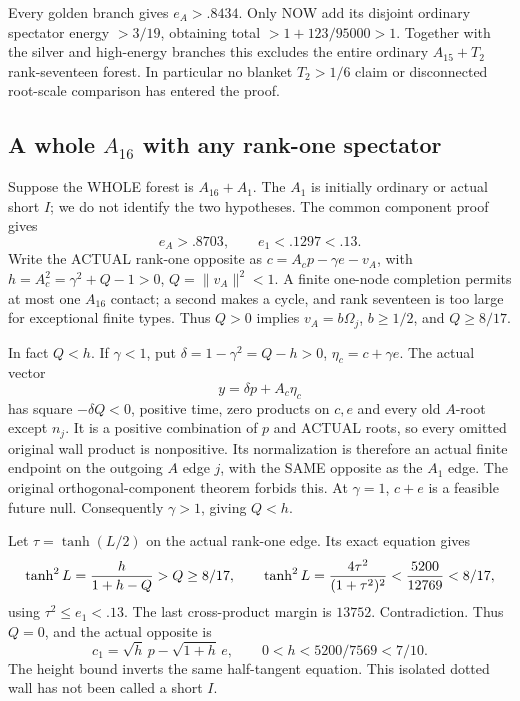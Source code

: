 Every golden branch gives \(e_A>.8434\).
Only NOW add its disjoint ordinary spectator
energy \(>3/19\), obtaining total
\(>1+123/95000>1\).
Together with the silver and high-energy
branches this excludes the entire ordinary
\(A_{15}+T_2\) rank-seventeen forest.
In particular no blanket \(T_2>1/6\)
claim or disconnected root-scale comparison
has entered the proof.

\subsection{A whole \(A_{16}\) with any rank-one spectator}
\label{app:arithA16rankone}

Suppose the WHOLE forest is \(A_{16}+A_1\).
The \(A_1\) is initially ordinary or
actual short \(I\); we do not identify
the two hypotheses.
The common component proof gives
\[
                 e_A>.8703,\qquad e_1<.1297<.13 .
\]
Write the ACTUAL rank-one opposite as
\(c=A_cp-\gamma e-v_A\), with
\(h=A_c^2=\gamma^2+Q-1>0\),
\(Q=\|v_A\|^2<1\).
A finite one-node completion permits at
most one \(A_{16}\) contact; a second
makes a cycle, and rank seventeen is
too large for exceptional finite types.
Thus \(Q>0\) implies
\(v_A=b\Omega_j\), \(b\ge1/2\), and
\(Q\ge8/17\).

In fact \(Q<h\).
If \(\gamma<1\), put
\(\delta=1-\gamma^2=Q-h>0\),
\(\eta_c=c+\gamma e\).
The actual vector
\[
                         y=\delta p+A_c\eta_c
\]
has square \(-\delta Q<0\), positive
time, zero products on \(c,e\) and
every old \(A\)-root except \(n_j\).
It is a positive combination of \(p\)
and ACTUAL roots, so every omitted
original wall product is nonpositive.
Its normalization is therefore an actual
finite endpoint on the outgoing \(A\)
edge \(j\), with the SAME opposite
as the \(A_1\) edge.
The original orthogonal-component theorem
forbids this.
At \(\gamma=1\), \(c+e\) is a feasible
future null.
Consequently \(\gamma>1\), giving \(Q<h\).

Let \(\tau=\tanh(L/2)\) on the actual
rank-one edge.
Its exact equation gives
\[
 \tanh^2L={h\over1+h-Q}>Q\ge8/17,
 \qquad
 \tanh^2L={4\tau^2\over(1+\tau^2)^2}
                       <{5200\over12769}<8/17 ,
\]
using \(\tau^2\le e_1<.13\).
The last cross-product margin is \(13752\).
Contradiction.
Thus \(Q=0\), and the actual opposite is
\[
                   c_1=\sqrt h\,p-\sqrt{1+h}\,e,\qquad
                    0<h<5200/7569<7/10 .
\tag{A16r1}\label{eq:arithA16rankoneisolated}
\]
The height bound inverts the same
half-tangent equation.
This isolated dotted wall has not been
called a short \(I\).

